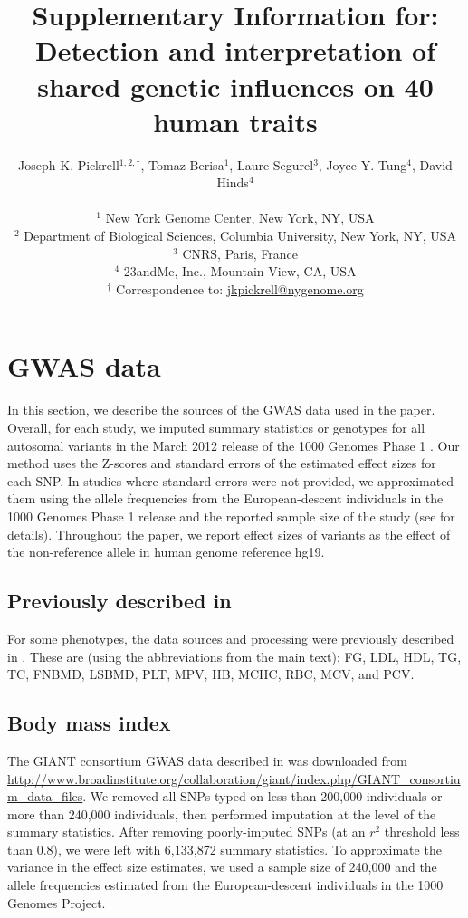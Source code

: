 \documentclass[11pt,titlepage]{article}
\begin{document}
\title{Supplementary Information for: Detection and interpretation of shared genetic influences on 40 human traits}
\author{Joseph K. Pickrell$^{1,2, \dagger}$, Tomaz Berisa${^1}$, Laure Segurel$^{3}$, Joyce Y. Tung${^4}$, David Hinds${^4}$\\ \\
\small $^1$ New York Genome Center, New York, NY, USA\\
\small $^2$ Department of Biological Sciences, Columbia University, New York, NY, USA \\
\small $^3$ CNRS, Paris, France \\
\small $^4$ 23andMe, Inc., Mountain View, CA, USA\\
\small $^\dagger$ Correspondence to: \url{jkpickrell@nygenome.org}
}
\maketitle

\tableofcontents
\clearpage

\section{GWAS data}
In this section, we describe the sources of the GWAS data used in the paper. Overall, for each study, we imputed summary statistics or genotypes for all autosomal variants in the March 2012 release of the 1000 Genomes Phase 1 \citep{abecasis2010map}. Our method uses the Z-scores and standard errors of the estimated effect sizes for each SNP. In studies where standard errors were not provided, we approximated them using the allele frequencies from the European-descent individuals in the 1000 Genomes Phase 1 release and the reported sample size of the study (see \citet{pickrell2013joint} for details). Throughout the paper, we report effect sizes of variants as the effect of the non-reference allele in human genome reference hg19. 
  
\subsection{Previously described in \citet{pickrell2013joint}}
For some phenotypes, the data sources and processing were previously described in \citet{pickrell2013joint}. These are (using the abbreviations from the main text): FG, LDL, HDL, TG, TC,  FNBMD, LSBMD, PLT, MPV, HB, MCHC, RBC, MCV, and PCV. \subsection{Body mass index}
The GIANT consortium GWAS data described in \citet{Locke:2015aa} was downloaded from \url{http://www.broadinstitute.org/collaboration/giant/index.php/GIANT_consortium_data_files}. We removed all SNPs typed on less than 200,000 individuals or more than 240,000 individuals, then performed imputation at the level of the summary statistics. After removing poorly-imputed SNPs (at an $r^2$ threshold less than 0.8), we were left with 6,133,872 summary statistics. To approximate the variance in the effect size estimates, we used a sample size of 240,000 and the allele frequencies estimated from the European-descent individuals in the 1000 Genomes Project. 
\end{document}
